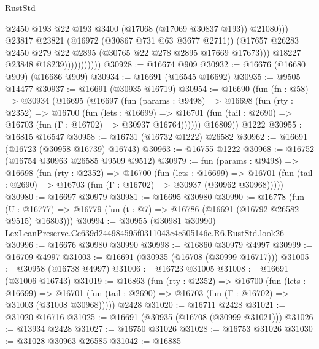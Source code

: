 \begin{lexlean}{RustStd}
\begin{coremodule}
                                  @2450
                                  @193
                                  @22
                                  @193
                                  @3400
                                  (@17068 (@17069 @30837 @193))
                                  @21080)))
                            @23817
                            @23821
                            (@16972 (@30867 @731 @63 @3677 @2711))
                            (@17657
                              @26283
                              @2450
                              @279
                              @22
                              @2895
                              (@30765 @22 @278 @2895 @17669 @17673)))
                          @18227
                          @23848
                          @18239)))))))))))
@30928 := @16674 @909
@30932 := @16676 (@16680 @909) (@16686 @909)
@30934 := @16691 (@16545 @16692)
@30935 := @9505 @14477
@30937 := @16691 (@30935 @16719)
@30954 := @16690
    (fun (fn : @58) =>
    @30934
      (@16695
        (@16697
          (fun (params : @9498) =>
          @16698
            (fun (rty : @2352) =>
            @16700
              (fun (lets : @16699) =>
              @16701 (fun (tail : @2690) => @16703 (fun (Γ : @16702) => @30937 @16764))))))
        @16809))
    @1222
@30955 := @16815 @16547
@30958 := @16731 (@16732 @1222) @26582
@30962 := @16691 (@16723 (@30958 @16739) @16743)
@30963 := @16755 @1222
@30968 := @16752 (@16754 @30963 @26585 @9509 @9512)
@30979 := fun (params : @9498) =>
  @16698
    (fun (rty : @2352) =>
    @16700
      (fun (lets : @16699) =>
      @16701 (fun (tail : @2690) => @16703 (fun (Γ : @16702) => @30937 (@30962 @30968)))))
@30980 := @16697 @30979
@30981 := @16695 @30980
@30990 := @16778
    (fun (U : @16777) => @16779 (fun (t : @7) => @16786 (@16691 (@16792 @26582 @9515) @16803)))
@30994 := @30955 (@30981 @30990) LexLeanPreserve.Cc639d244984595f0311043c4c505146e.R6.RustStd.look26
@30996 := @16676 @30980 @30990
@30998 := @16860 @30979 @4997
@30999 := @16709 @4997
@31003 := @16691 (@30935 (@16708 (@30999 @16717)))
@31005 := @30958 (@16738 @4997)
@31006 := @16723 @31005
@31008 := @16691 (@31006 @16743)
@31019 := @16863
    (fun (rty : @2352) =>
    @16700
      (fun (lets : @16699) =>
      @16701 (fun (tail : @2690) => @16703 (fun (Γ : @16702) => @31003 (@31008 @30968)))))
    @2428
@31020 := @16711 @2428
@31021 := @31020 @16716
@31025 := @16691 (@30935 (@16708 (@30999 @31021)))
@31026 := @13934 @2428
@31027 := @16750 @31026
@31028 := @16753 @31026
@31030 := @31028 @30963 @26585
@31042 := @16885

\end{coremodule}
\end{lexlean}
